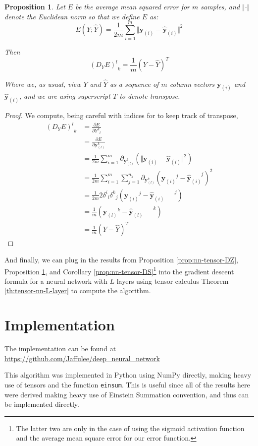 \documentclass[a4paper]{article}
\theoremstyle{plain} %
\newtheorem{proposition}[theorem]{Proposition}
\theoremstyle{definition} %
\numberwithin{equation}{subsection}
\newcommand{\del}[2]{\frac{\partial #1}{\partial #2}}
\newcommand{\vy}{{\textbf{y}}}
\newcommand{\vyh}{{\widehat{\textbf{y}}}}
\newcommand{\Yh}{{\widehat{Y}}}
\begin{document}
\begin{proposition} \label{prop:nn-tensor-DE}
  Let $E$ be the average mean squared error for $m$ samples, and $\Vert \cdot \Vert$ denote the Euclidean norm so that we define $E$ as:
  \[ E(Y;\Yh) = \frac{1}{2m} \sum_{i = 1}^m \Vert \vy_{(i)} - \vyh_{(i)} \Vert^2 \]

  Then 
  \[{(D_Y E)^l}_k = \frac{1}{m}\left(Y- \Yh \right)^T\]

  Where we, as usual, view $Y$ and $\Yh$ as a sequence of $m$ column vectors $\vy_{(i)}$ and $\vyh_{(i)}$, and we are using superscript $T$ to denote transpose.
\end{proposition}
\begin{proof}
  We compute, being careful with indices for to keep track of transpose,
  \begin{align*}
    {(D_YE)^l}_k &= \del{E}{{Y^k}_l} \\
     &= \del{E}{{\vy_{(l)}^k}} \\
     &= \frac{1}{2m}\sum_{i = 1}^m\partial_{\vy_{(l)}^k}\left(\Vert \vy_{(i)} - \vyh_{(i)} \Vert^2 \right) \\
     &= \frac{1}{2m}\sum_{i = 1}^m\sum_{j = 1}^{n_y}\partial_{\vy_{(l)}^k}\left({\vy_{(i)}}^j - {\vyh}_{(i)}^{\phantom{(i)}j} \right)^2 \\
     &= \frac{1}{2m}2{\delta^i}_l{\delta^k}_j\left({\vy_{(i)}}^j - {\vyh_{(i)}}^{\phantom{(i)}j} \right) \\
     &= \frac{1}{m}\left({\vy_{(l)}}^k - {\vyh_{(l)}}^{\phantom{(l)}k} \right) \\
     &= \frac{1}{m}\left(Y- \Yh \right)^T
  \end{align*}
\end{proof}

And finally, we can plug in the results from Proposition \ref{prop:nn-tensor-DZ}, Proposition \ref{prop:nn-tensor-DE}, and Corollary \ref{prop:nn-tensor-DS}\footnote{The latter two are only in the case of using the sigmoid activation function and the average mean square error for our error function.} 
into the gradient descent formula for a neural network with $L$ layers using tensor calculus Theorem \ref{th:tensor-nn-L-layer} to compute the algorithm.
\newpage
\section{Implementation}
The implementation can be found at \url{https://github.com/Jaffulee/deep_neural_network}

This algorithm was implemented in Python using NumPy directly, making heavy use of tensors and the function \verb+einsum+. This is useful since all of the results here were derived making heavy use of Einstein Summation convention, and thus can be implemented directly.
\end{document}
